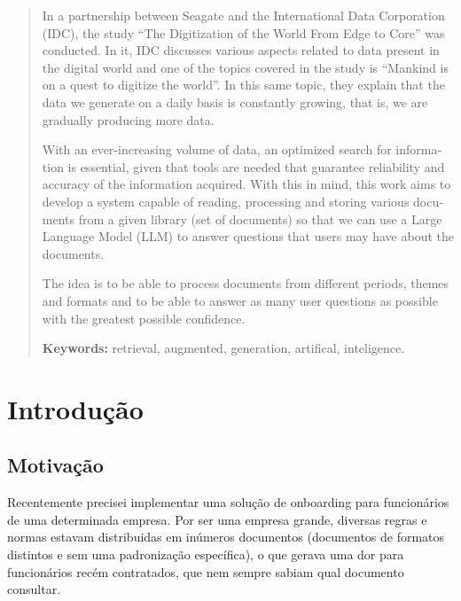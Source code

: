 \documentclass[a4paper, 12pt]{article}
\begin{document}
    \begin{english}
        \begin{abstract}
            In a partnership between Seagate and the International Data Corporation (IDC), the study “The Digitization of the World From Edge to Core” was conducted. In it, IDC discusses various aspects related to data present in the digital world and one of the topics covered in the study is “Mankind is on a quest to digitize the world”. In this same topic, they explain that the data we generate on a daily basis is constantly growing, that is, we are gradually producing more data.

            With an ever-increasing volume of data, an optimized search for information is essential, given that tools are needed that guarantee reliability and accuracy of the information acquired. With this in mind, this work aims to develop a system capable of reading, processing and storing various documents from a given library (set of documents) so that we can use a Large Language Model (LLM) to answer questions that users may have about the documents.

            The idea is to be able to process documents from different periods, themes and formats and to be able to answer as many user questions as possible with the greatest possible confidence.

            \begin{flushleft}
                \textbf{Keywords:} retrieval, augmented, generation, artifical, inteligence.
            \end{flushleft}
        \end{abstract}
    \end{english}
    \clearpage

    \tableofcontents
    \clearpage

    \listoffigures
    \clearpage

    \listoftables
    \clearpage

    \listofalgorithms
    \clearpage

    \setcounter{page}{1}

    \section{Introdução}

    \subsection{Motivação}
    Recentemente precisei implementar uma solução de onboarding para funcionários de uma determinada empresa. Por ser uma empresa grande, diversas regras e normas estavam distribuidas em inúmeros documentos (documentos de formatos distintos e sem uma padronização específica), o que gerava uma dor para funcionários recém contratados, que nem sempre sabiam qual documento consultar.
\end{document}
